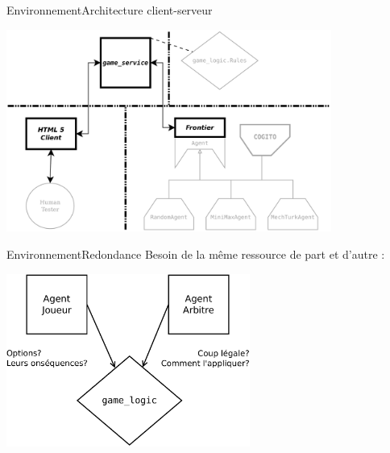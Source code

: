 \begin{frame}{Environnement}{Architecture client-serveur}
\begin{center}
\includegraphics[width=0.8\textwidth]{img/william/archi_clients_serveur}\\
\end{center}
\end{frame}
\begin{frame}{Environnement}{Redondance}
Besoin de la même ressource de part et d'autre :
\begin{center}
\includegraphics[width=0.6\textwidth]{img/william/game_logic_shared}\\
\end{center}
\end{frame}

